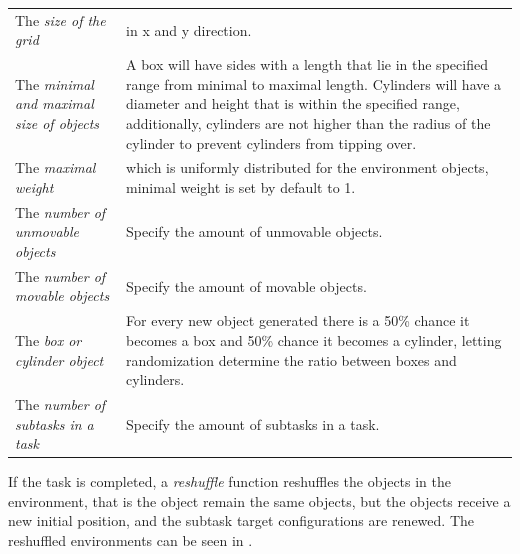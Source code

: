 \noindent
\begin{table}[H]
\centering
\begin{tabular}%
{>{\raggedright\arraybackslash}p{}%
>{\raggedright\arraybackslash}p{}}
The \textit{size of the grid} & in \gls{x} and \gls{y} direction.\\
The \textit{minimal and maximal size of objects} & A box will have sides with a length that lie in the specified range from minimal to maximal length. Cylinders will have a diameter and height that is within the specified range, additionally, cylinders are not higher than the radius of the cylinder to prevent cylinders from tipping over. \\
The \textit{maximal weight} & which is uniformly distributed for the environment objects, minimal weight is set by default to 1. \\
The \textit{number of unmovable objects} & Specify the amount of unmovable objects.\\
The \textit{number of movable objects} & Specify the amount of movable objects.\\
The \textit{box or cylinder object} & For every new object generated there is a 50\% chance it becomes a box and 50\% chance it becomes a cylinder, letting randomization determine the ratio between boxes and cylinders. \\
The \textit{number of subtasks in a task} & Specify the amount of subtasks in a task.
\end{tabular}
\end{table}

If the task is completed, a \textit{reshuffle} function reshuffles the objects in the environment, that is the object remain the same objects, but the objects receive a new initial position, and the subtask target configurations are renewed. The reshuffled environments can be seen in .\bs


